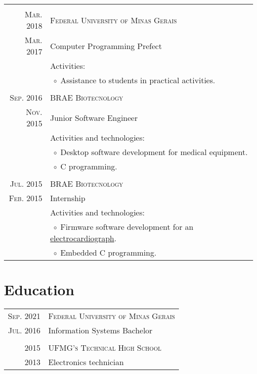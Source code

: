 \documentclass[a4paper,10pt]{article}
\newcommand{\tabitem}{$\;\circ\;$}
\renewcommand\#{\protect\scalebox{0.8}{\protect\raisebox{0.4ex}{\char"0023}}}
\begin{document}
\begin{tabular}{r|p{12.3cm}}
  \multicolumn{2}{c}{} \\
  \textsc{Mar. 2018} & \textsc{Federal University of Minas Gerais} \\
  \textsc{Mar. 2017} & Computer Programming Prefect \\[5pt]
  & Activities: \\
  & \tabitem Assistance to students in practical activities. \\
  
  \multicolumn{2}{c}{} \\
  \textsc{Sep. 2016} & \textsc{BRAE Biotecnology} \\
  \textsc{Nov. 2015} & Junior Software Engineer \\[5pt]
  & Activities and technologies: \\
  & \tabitem Desktop software development for medical equipment.\\
  & \tabitem C\# programming. \\
  
  \multicolumn{2}{c}{} \\
  \textsc{Jul. 2015} & \textsc{BRAE Biotecnology} \\
  \textsc{Feb. 2015} & Internship \\[5pt]
  & Activities and technologies: \\
  & \tabitem Firmware software development for an \href{http://www.ferox.vet.br/pt-br/produtos/ecg-veterinario.aspx}{electrocardiograph}. \\
  & \tabitem Embedded C programming.
\end{tabular}


\section{Education}
\begin{tabular}{r|l}
  \textsc{Sep. 2021} & \textsc{Federal University of Minas Gerais} \\
  \textsc{Jul. 2016} & Information Systems Bachelor \\
  
  \multicolumn{2}{c}{} \\
  \textsc{2015} & \textsc{UFMG's Technical High School} \\
  \textsc{2013} & Electronics technician \\
\end{tabular}
\end{document}

